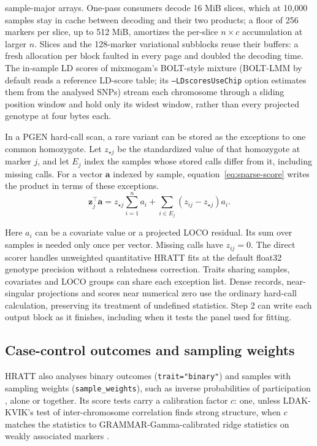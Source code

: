 \documentclass[11pt]{article}
\newcommand{\code}[1]{\texttt{#1}}
\begin{document}
sample-major arrays.
One-pass consumers decode 16 MiB slices, which at 10,000 samples stay in
cache between decoding and their two products; a floor of 256 markers per
slice, up to 512 MiB, amortizes the per-slice $n\times c$ accumulation at
larger $n$. Slices and the 128-marker variational subblocks reuse their
buffers: a fresh allocation per block faulted in every page and doubled
the decoding time.
The in-sample LD scores of mixmogam's BOLT-style mixture (BOLT-LMM by
default reads a reference LD-score table; its \code{--LDscoresUseChip}
option estimates them from the analysed SNPs) stream each chromosome through a sliding
position window and hold only its widest window, rather than every
projected genotype at four bytes each.

\begin{samepage}
In a PGEN hard-call scan, a rare variant can be stored as the exceptions
to one common homozygote. Let $z_{\star j}$ be the standardized value of
that homozygote at marker $j$, and let $E_j$ index the samples whose
stored calls differ from it, including missing calls. For a vector
$\mathbf a$ indexed by sample, equation~\eqref{eq:sparse-score} writes
the product in terms of these exceptions.
\begin{equation}
 \mathbf z_j^\top\mathbf a
 = z_{\star j}\sum_{i=1}^n a_i
 + \sum_{i\in E_j}(z_{ij}-z_{\star j})a_i .
 \label{eq:sparse-score}
\end{equation}
\end{samepage}
Here $a_i$ can be a covariate value or a projected LOCO residual. Its
sum over samples is needed only once per vector. Missing calls have
$z_{ij}=0$. The direct scorer handles unweighted quantitative HRATT fits
at the default float32 genotype precision without a relatedness correction.
Traits sharing samples, covariates and LOCO groups can share each exception
list. Dense records, near-singular projections and scores near numerical zero use the ordinary
hard-call calculation, preserving its treatment of undefined statistics.
Step 2 can write each output block as it finishes, including when it tests
the panel used for fitting.

\subsection{Case-control outcomes and sampling weights}
\label{sec:weights-binary}

HRATT also analyses binary outcomes (\code{trait="binary"}) and samples
with sampling weights (\code{sample\_weights}), such as inverse
probabilities of participation \citep{schoeler2023}, alone or together.
Its score tests carry a calibration factor $c$: one, unless LDAK-KVIK's
test of inter-chromosome correlation finds strong structure, when $c$
matches the statistics to GRAMMAR-Gamma-calibrated ridge statistics on
weakly associated markers \citep{hof2025}.
\end{document}
